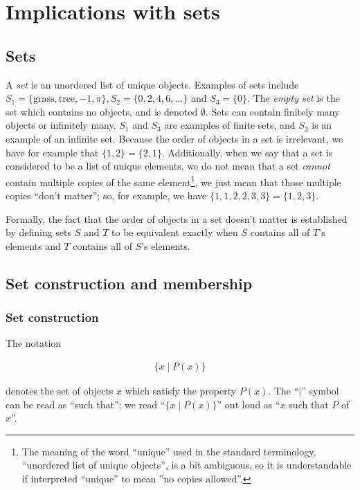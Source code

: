\section{Implications with sets}

\subsection*{Sets}

A \textit{set} is an unordered list of unique objects. Examples of sets include $S_1 = \{\text{grass}, \text{tree}, -1, \pi\}, S_2 = \{0, 2, 4, 6, ...\}$ and $S_3 = \{0\}$. The \textit{empty set} is the set which contains no objects, and is denoted $\emptyset$. Sets can contain finitely many objects or infinitely many. $S_1$ and $S_3$ are examples of finite sets, and $S_2$ is an example of an infinite set. Because the order of objects in a set is irrelevant, we have for example that $\{1, 2\} = \{2, 1\}$. Additionally, when we say that a set is considered to be a list of unique elements, we do not mean that a set \textit{cannot} contain multiple copies of the same element\footnote{The meaning of the word ``unique'' used in the standard terminology, ``unordered list of unique objects'', is a bit ambiguous, so it is understandable if interpreted ``unique'' to mean ''no copies allowed''.}, we just mean that those multiple copies ``don't matter''; so, for example, we have $\{1, 1, 2, 2, 3, 3 \} = \{1, 2, 3\}$.

Formally, the fact that the order of objects in a set doesn't matter is established by defining sets $S$ and $T$ to be equivalent exactly when $S$ contains all of $T$'s elements and $T$ contains all of $S$'s elements.

\subsection*{Set construction and membership}

\subsubsection*{Set construction}

The notation

\begin{align*}
    \{ x \mid P(x) \}
\end{align*}

denotes the set of objects $x$ which satisfy the property $P(x)$. The ``$\mid$'' symbol can be read as ``such that''; we read ``$\{ x \mid P(x) \}$'' out loud as ``$x$ such that $P$ of $x$''. 

